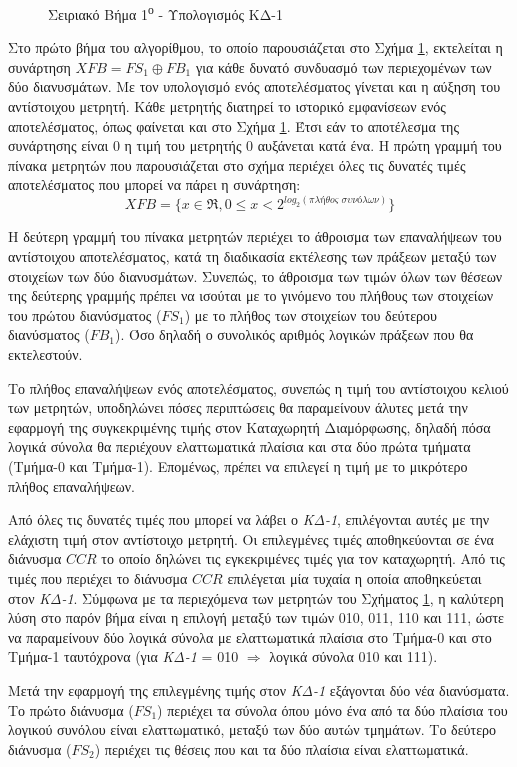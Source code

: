 \begin{figure}[t]
    \centering
    \caption{Σειριακό Βήμα 1\textsuperscript{ο} - Υπολογισμός ΚΔ-1}
    \label{fig:chap5_serial_step1}
\end{figure}

Στο πρώτο βήμα του αλγορίθμου, το οποίο παρουσιάζεται στο Σχήμα \ref{fig:chap5_serial_step1}, εκτελείται η συνάρτηση $XFB = FS_{1} \oplus FB_{1}$ για κάθε δυνατό συνδυασμό των περιεχομένων των δύο διανυσμάτων. Με τον υπολογισμό ενός αποτελέσματος γίνεται και η αύξηση του αντίστοιχου μετρητή. Κάθε μετρητής διατηρεί το ιστορικό εμφανίσεων ενός αποτελέσματος, όπως φαίνεται και στο Σχήμα \ref{fig:chap5_serial_step1}. Έτσι εάν το αποτέλεσμα της συνάρτησης είναι 0 η τιμή του μετρητής 0 αυξάνεται κατά ένα. Η πρώτη γραμμή του πίνακα μετρητών που παρουσιάζεται στο σχήμα περιέχει όλες τις δυνατές τιμές αποτελέσματος που μπορεί να πάρει η συνάρτηση:
\begin{equation}
    XFB = \{x \in \Re, 0 \leq x < 2^{log_2(\textit{πλήθος συνόλων})}\}
\end{equation}

Η δεύτερη γραμμή του πίνακα μετρητών περιέχει το άθροισμα των επαναλήψεων του αντίστοιχου αποτελέσματος, κατά τη διαδικασία εκτέλεσης των πράξεων \xor μεταξύ των στοιχείων των δύο διανυσμάτων. Συνεπώς, το άθροισμα των τιμών όλων των θέσεων της δεύτερης γραμμής πρέπει να ισούται με το γινόμενο του πλήθους των στοιχείων του πρώτου διανύσματος ($FS_{1}$) με το πλήθος των στοιχείων του δεύτερου διανύσματος ($FB_{1}$). Όσο δηλαδή ο συνολικός αριθμός λογικών πράξεων \xor που θα εκτελεστούν.
\par
Το πλήθος επαναλήψεων ενός αποτελέσματος, συνεπώς η τιμή του αντίστοιχου κελιού των μετρητών, υποδηλώνει πόσες περιπτώσεις θα παραμείνουν άλυτες μετά την εφαρμογή της συγκεκριμένης τιμής στον Καταχωρητή Διαμόρφωσης, δηλαδή πόσα λογικά σύνολα θα περιέχουν ελαττωματικά πλαίσια και στα δύο πρώτα τμήματα (Τμήμα-0 και Τμήμα-1). Επομένως, πρέπει να επιλεγεί η τιμή με το μικρότερο πλήθος επαναλήψεων.
\par
Από όλες τις δυνατές τιμές που μπορεί να λάβει ο \textit{ΚΔ-1}, επιλέγονται  αυτές με την ελάχιστη τιμή στον αντίστοιχο μετρητή. Οι επιλεγμένες τιμές αποθηκεύονται σε ένα διάνυσμα $CCR$ το οποίο δηλώνει τις εγκεκριμένες τιμές για τον καταχωρητή. Από τις τιμές που περιέχει το διάνυσμα $CCR$ επιλέγεται μία τυχαία η οποία αποθηκεύεται στον \textit{ΚΔ-1}. Σύμφωνα με τα περιεχόμενα των μετρητών του Σχήματος \ref{fig:chap5_serial_step1}, η καλύτερη λύση στο παρόν βήμα είναι η επιλογή μεταξύ των τιμών 010, 011, 110 και 111, ώστε να παραμείνουν δύο λογικά σύνολα με ελαττωματικά πλαίσια στο Τμήμα-0 και στο Τμήμα-1 ταυτόχρονα (για \textit{ΚΔ-1} = 010 $\Rightarrow$ λογικά σύνολα 010 και 111).
\par
Μετά την εφαρμογή της επιλεγμένης τιμής στον \textit{ΚΔ-1} εξάγονται δύο νέα διανύσματα. Το πρώτο διάνυσμα ($FS_{1}$) περιέχει τα σύνολα όπου μόνο ένα από τα δύο πλαίσια του λογικού συνόλου είναι ελαττωματικό, μεταξύ των δύο αυτών τμημάτων. Το δεύτερο διάνυσμα ($FS_{2}$) περιέχει τις θέσεις που και τα δύο πλαίσια είναι ελαττωματικά.

